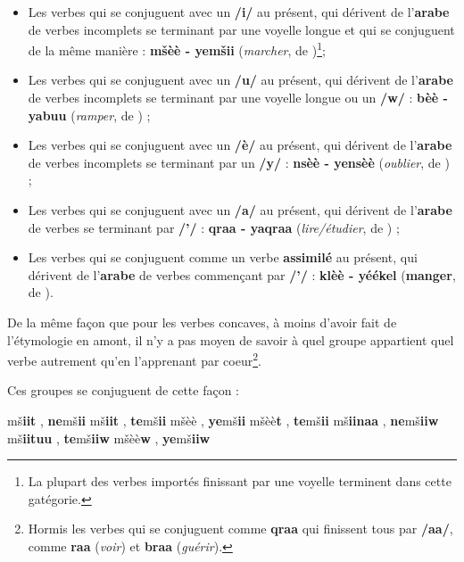 \begin{itemize}
    \item Les verbes qui se conjuguent avec un \textbf{/i/} au présent, qui dérivent de l'\textbf{arabe} de verbes incomplets se terminant par une voyelle longue et qui se conjuguent de la même manière : \textbf{m\v{s}èè - yem\v{s}ii} (\textit{marcher}, de )\footnote{La plupart des verbes importés finissant par une voyelle terminent dans cette gatégorie.};
    \item Les verbes qui se conjuguent avec un \textbf{/u/} au présent, qui dérivent de l'\textbf{arabe} de verbes incomplets se terminant par une voyelle longue ou un \textbf{/w/} : \textbf{\textcrh bèè - ya\textcrh buu} (\textit{ramper}, de ) ;
    \item Les verbes qui se conjuguent avec un \textbf{/è/} au présent, qui dérivent de l'\textbf{arabe} de verbes incomplets se terminant par un \textbf{/y/} : \textbf{nsèè - yensèè} (\textit{oublier}, de ) ;
    \item Les verbes qui se conjuguent avec un \textbf{/a/} au présent, qui dérivent de l'\textbf{arabe} de verbes se terminant par \textbf{/'/} : \textbf{qraa - yaqraa} (\textit{lire/étudier}, \linebreak de ) ; 
    \item Les verbes qui se conjuguent comme un verbe \textbf{assimilé} au présent, qui dérivent de l'\textbf{arabe} de verbes commençant par \textbf{/'/} : \textbf{klèè - yéékel} (\textbf{manger}, de ).
\end{itemize}

De la même façon que pour les verbes concaves, à moins d'avoir fait de l'étymologie en amont, il n'y a pas moyen de savoir à quel groupe appartient quel verbe autrement qu'en l'apprenant par coeur\footnote{Hormis les verbes qui se conjuguent comme \textbf{qraa} qui finissent tous par \textbf{/aa/}, comme \textbf{raa} (\textit{voir}) et \textbf{braa} (\textit{guérir}).}. 

Ces groupes se conjuguent de cette façon :

    {m\v{s}\textbf{iit} , \textbf{ne}m\v{s}\textbf{ii}}
    {m\v{s}\textbf{iit} , \textbf{te}m\v{s}\textbf{ii}}
    {m\v{s}èè , \textbf{ye}m\v{s}\textbf{ii}}
    {m\v{s}èè\textbf{t} , \textbf{te}m\v{s}\textbf{ii}}
    {m\v{s}\textbf{iinaa} , \textbf{ne}m\v{s}\textbf{iiw}}
    {m\v{s}\textbf{iituu} , \textbf{te}m\v{s}\textbf{iiw}}
    {m\v{s}èè\textbf{w} , \textbf{ye}m\v{s}\textbf{iiw}}

